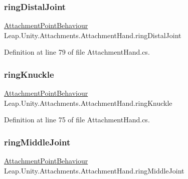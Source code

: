 \subsubsection{\texorpdfstring{ringDistalJoint}{ringDistalJoint}}
{\footnotesize\ttfamily \mbox{\hyperlink{class_leap_1_1_unity_1_1_attachments_1_1_attachment_point_behaviour}{Attachment\+Point\+Behaviour}} Leap.\+Unity.\+Attachments.\+Attachment\+Hand.\+ring\+Distal\+Joint}



Definition at line 79 of file Attachment\+Hand.\+cs.

\mbox{\label{class_leap_1_1_unity_1_1_attachments_1_1_attachment_hand_aa0d764bc020a449f6fd4da335f61868b}} 
\subsubsection{\texorpdfstring{ringKnuckle}{ringKnuckle}}
{\footnotesize\ttfamily \mbox{\hyperlink{class_leap_1_1_unity_1_1_attachments_1_1_attachment_point_behaviour}{Attachment\+Point\+Behaviour}} Leap.\+Unity.\+Attachments.\+Attachment\+Hand.\+ring\+Knuckle}



Definition at line 75 of file Attachment\+Hand.\+cs.

\mbox{\label{class_leap_1_1_unity_1_1_attachments_1_1_attachment_hand_a3c263a4e2585c05953909f9fa25ba91a}} 
\subsubsection{\texorpdfstring{ringMiddleJoint}{ringMiddleJoint}}
{\footnotesize\ttfamily \mbox{\hyperlink{class_leap_1_1_unity_1_1_attachments_1_1_attachment_point_behaviour}{Attachment\+Point\+Behaviour}} Leap.\+Unity.\+Attachments.\+Attachment\+Hand.\+ring\+Middle\+Joint}



